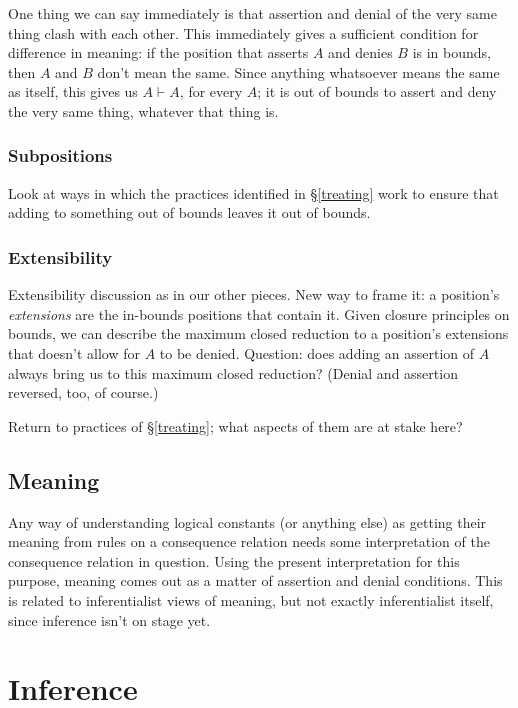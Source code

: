 \documentclass{article}
\newcommand{\cns}{\vdash}
\begin{document}
One thing we can say immediately is that assertion and denial of the very same thing clash with each other. 
This immediately gives a sufficient condition for difference in meaning: if the position that asserts $A$ and denies $B$ is in bounds, then $A$ and $B$ don't mean the same.
Since anything whatsoever means the same as itself, this gives us $A \cns A$, for every $A$; it is out of bounds to assert and deny the very same thing, whatever that thing is.


\subsubsection{Subpositions} \label{weakening}

Look at ways in which the practices identified in \S\ref{treating} work to ensure that adding to something out of bounds leaves it out of bounds.

\subsubsection{Extensibility} \label{cut}

Extensibility discussion as in our other pieces.
New way to frame it: a position's {\em extensions} are the in-bounds positions that contain it. 
Given closure principles on bounds, we can describe the maximum closed reduction to a position's extensions that doesn't allow for $A$ to be denied.
Question: does adding an assertion of $A$ always bring us to this maximum closed reduction?
(Denial and assertion reversed, too, of course.)

Return to practices of \S\ref{treating}; what aspects of them are at stake here?

\subsection{Meaning} \label{meaning}

Any way of understanding logical constants (or anything else) as getting their meaning from rules on a consequence relation needs some interpretation of the consequence relation in question.
Using the present interpretation for this purpose, meaning comes out as a matter of assertion and denial conditions.
This is related to inferentialist views of meaning, but not exactly inferentialist itself, since inference isn't on stage yet.


\section{Inference}
\end{document}
